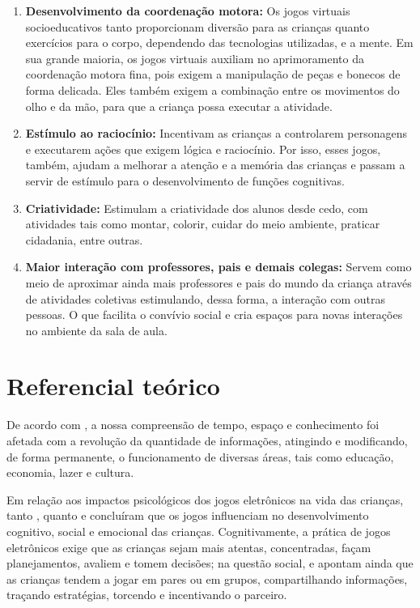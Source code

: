 \documentclass[article,12pt,openany,oneside,a4paper,english,brazil]{abntex2}
\begin{document}
\begin{enumerate}
  \item \textbf{Desenvolvimento da coordenação motora:}  Os jogos virtuais socioeducativos tanto proporcionam diversão para as crianças quanto exercícios para o corpo, dependendo das tecnologias utilizadas, e a mente. Em sua grande maioria, os jogos virtuais auxiliam no aprimoramento da coordenação motora fina, pois exigem a manipulação de peças e bonecos de forma delicada. Eles também exigem a combinação entre os movimentos do olho e da mão, para que a criança possa executar a atividade.
  
  \item \textbf{Estímulo ao raciocínio:} Incentivam as crianças a controlarem personagens e executarem ações que exigem lógica e raciocínio. Por isso, esses jogos, também, ajudam a melhorar a atenção e a memória das crianças e passam a servir de estímulo para o desenvolvimento de funções cognitivas.
  
  \item \textbf{Criatividade:} Estimulam a criatividade dos alunos desde cedo, com atividades tais como montar, colorir, cuidar do meio ambiente, praticar cidadania, entre outras.
  
   \item \textbf{Maior interação com professores, pais e demais colegas:} Servem como meio de aproximar ainda mais professores e pais do mundo da criança através de atividades coletivas estimulando, dessa forma, a interação com outras pessoas. O que facilita o convívio social e cria espaços para novas interações no ambiente da sala de aula.
  
\end{enumerate}

\section{Referencial teórico}
\label{sc:ref}

De acordo com , a nossa compreensão de tempo, espaço e conhecimento foi afetada com a revolução da quantidade de informações, atingindo e modificando, de forma permanente, o funcionamento de diversas áreas, tais como educação, economia, lazer e cultura.

Em relação aos impactos psicológicos dos jogos eletrônicos na vida das crianças, tanto , quanto   e  concluíram que os jogos influenciam no desenvolvimento cognitivo, social e emocional das crianças. Cognitivamente, a prática de jogos eletrônicos exige que as crianças sejam mais atentas, concentradas, façam planejamentos, avaliem e tomem decisões; na questão social,  e  apontam ainda que as crianças tendem a jogar em pares ou em grupos, compartilhando informações, traçando estratégias, torcendo e incentivando o parceiro.
\end{document}
